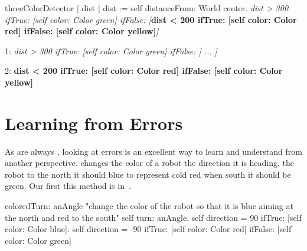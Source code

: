 {\noindent
\begin{minipage}[l]{8cm}
\begin{method}\label{mth:detector4}
threeColorDetector
   | dist | 
   dist := self distanceFrom: World  center.
   \textit{dist > 300
      ifTrue: [self color: Color green]
      ifFalse: [}\textbf{dist < 200
         ifTrue: [self color: Color red]
         ifFalse: [self color: Color yellow]}\textit{]}
\end{method}
\end{minipage}
\hspace{1cm}
\begin{minipage}[r]{8cm}
\begin{nalltt}
\textrm{ 1:}
\textit{dist > 300
      ifTrue: [self color: Color green]
      ifFalse: [ ... ]}

\textrm{ 2:}
\textbf{dist < 200
         ifTrue: [self color: Color red]
         ifFalse: [self color: Color yellow]}
\end{nalltt}
\end{minipage}



\section{Learning from Errors}
As  are always  , looking at errors is an excellent way to learn and understand  from another perspective.     changes the color of a robot  the direction  it is heading.  the robot  to the north it should  blue to represent cold red when  south it should be green. Our first  this method is  in~. 

\begin{method}\label{mth:colored}
coloredTurn: anAngle
     "change the color of the robot so that it is blue aiming 
     at the north and red to the south"
     self turn: anAngle.
     self direction = 90
         ifTrue: [self color: Color blue].
     self direction = -90
         ifTrue: [self color: Color red]
         ifFalse: [self color: Color green]
\end{method}

}
